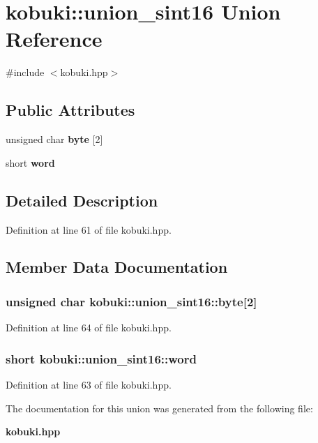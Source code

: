 \section{kobuki\-:\-:union\-\_\-sint16 \-Union \-Reference}
\label{unionkobuki_1_1union__sint16}


{\ttfamily \#include $<$kobuki.\-hpp$>$}

\subsection*{\-Public \-Attributes}
\begin{DoxyCompactItemize}
\item 
unsigned char {\bf byte} [2]
\item 
short {\bf word}
\end{DoxyCompactItemize}


\subsection{\-Detailed \-Description}


\-Definition at line 61 of file kobuki.\-hpp.



\subsection{\-Member \-Data \-Documentation}
\subsubsection[{byte}]{\setlength{\rightskip}{0pt plus 5cm}unsigned char {\bf kobuki\-::union\-\_\-sint16\-::byte}[2]}\label{unionkobuki_1_1union__sint16_a4a741b269df98ac2cb4d90e67c1048a6}


\-Definition at line 64 of file kobuki.\-hpp.

\subsubsection[{word}]{\setlength{\rightskip}{0pt plus 5cm}short {\bf kobuki\-::union\-\_\-sint16\-::word}}\label{unionkobuki_1_1union__sint16_aa13ccf773b329c89ee27ee71e9517b7e}


\-Definition at line 63 of file kobuki.\-hpp.



\-The documentation for this union was generated from the following file\-:\begin{DoxyCompactItemize}
\item 
{\bf kobuki.\-hpp}\end{DoxyCompactItemize}
